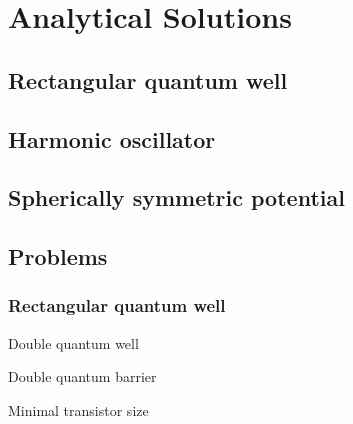 \section{Analytical Solutions}
	\subsection{Rectangular quantum well}
	\subsection{Harmonic oscillator}
	\subsection{Spherically symmetric potential}
	\subsection{Problems}
		\subsubsection{Rectangular quantum well}
			Double quantum well
			
			Double quantum barrier
			
			Minimal transistor size
			
			